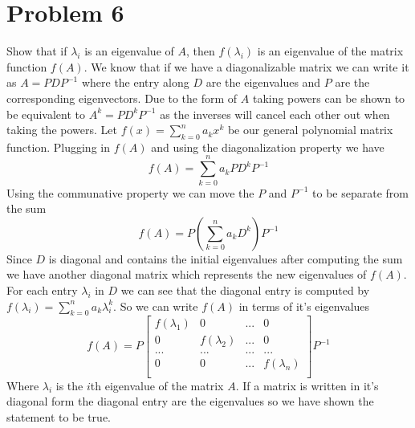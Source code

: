 \documentclass{article}
\begin{document}
\section*{Problem 6}
Show that if $\lambda_i$ is an eigenvalue of $A$, then $f(\lambda_i)$ is an eigenvalue of the matrix function $f(A)$.
\newline
\newline
We know that if we have a diagonalizable matrix we can write it as $A = PDP^{-1}$ where the entry along $D$ are the eigenvalues and $P$ are the corresponding eigenvectors.
Due to the form of $A$ taking powers can be shown to be equivalent to $A^k = PD^kP^{-1}$ as the inverses will cancel each other out when taking the powers.
Let $f(x) = \sum_{k=0}^n a_k x^k$ be our general polynomial matrix function.
Plugging in $f(A)$ and using the diagonalization property we have
$$ f(A) = \sum_{k=0}^n a_k PD^kP^{-1} $$
Using the communative property we can move the $P$ and $P^{-1}$ to be separate from the sum
$$ f(A) = P(\sum_{k=0}^n a_k D^k)P^{-1} $$
Since $D$ is diagonal and contains the initial eigenvalues after computing the sum we have another diagonal matrix which represents the new eigenvalues of $f(A)$.
For each entry $\lambda_i$ in $D$ we can see that the diagonal entry is computed by $f(\lambda_i) = \sum_{k=0}^n a_k \lambda_i^k$.
So we can write $f(A)$ in terms of it's eigenvalues
$$ f(A) = P
\begin{bmatrix}
f(\lambda_1) & 0  & ... & 0 \\
0 & f(\lambda_2) & ... & 0 \\
... & ... & ... & ... \\
0 & 0 & ... & f(\lambda_n) \\
\end{bmatrix}
P^{-1}
$$
Where $\lambda_i$ is the $i$th eigenvalue of the matrix $A$.
\newline
\newline
If a matrix is written in it's diagonal form the diagonal entry are the eigenvalues so we have shown the statement to be true.
\end{document}
